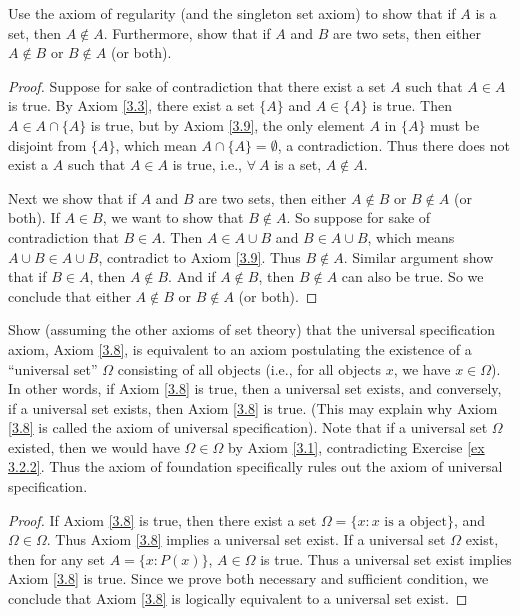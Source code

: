 \begin{exercise}\label{ex 3.2.2}
Use the axiom of regularity (and the singleton set axiom) to show that if \(A\) is a set, then \(A \notin A\).
Furthermore, show that if \(A\) and \(B\) are two sets, then either \(A \notin B\) or \(B \notin A\) (or both).
\end{exercise}

\begin{proof}
Suppose for sake of contradiction that there exist a set \(A\) such that \(A \in A\) is true.
By Axiom \ref{3.3}, there exist a set \(\{A\}\) and \(A \in \{A\}\) is true.
Then \(A \in A \cap \{A\}\) is true, but by Axiom \ref{3.9}, the only element \(A\) in \(\{A\}\) must be disjoint from \(\{A\}\), which mean \(A \cap \{A\} = \emptyset\), a contradiction.
Thus there does not exist a \(A\) such that \(A \in A\) is true, i.e., \(\forall\ A\) is a set, \(A \notin A\).

Next we show that if \(A\) and \(B\) are two sets, then either \(A \notin B\) or \(B \notin A\) (or both).
If \(A \in B\), we want to show that \(B \notin A\).
So suppose for sake of contradiction that \(B \in A\).
Then \(A \in A \cup B\) and \(B \in A \cup B\), which means \(A \cup B \in A \cup B\), contradict to Axiom \ref{3.9}.
Thus \(B \notin A\).
Similar argument show that if \(B \in A\), then \(A \notin B\).
And if \(A \notin B\), then \(B \notin A\) can also be true.
So we conclude that either \(A \notin B\) or \(B \notin A\) (or both).
\end{proof}

\begin{exercise}\label{ex 3.2.3}
Show (assuming the other axioms of set theory) that the universal specification axiom, Axiom \ref{3.8}, is equivalent to an axiom postulating the existence of a ``universal set'' \(\Omega\) consisting of all objects (i.e., for all objects \(x\), we have \(x \in \Omega\)).
In other words, if Axiom \ref{3.8} is true, then a universal set exists, and conversely, if a universal set exists, then Axiom \ref{3.8} is true.
(This may explain why Axiom \ref{3.8} is called the axiom of universal specification).
Note that if a universal set \(\Omega\) existed, then we would have \(\Omega \in \Omega\) by Axiom \ref{3.1}, contradicting Exercise \ref{ex 3.2.2}.
Thus the axiom of foundation specifically rules out the axiom of universal specification.
\end{exercise}

\begin{proof}
If Axiom \ref{3.8} is true, then there exist a set \(\Omega = \{x: x \text{ is a object}\}\), and \(\Omega \in \Omega\).
Thus Axiom \ref{3.8} implies a universal set exist.
If a universal set \(\Omega\) exist, then for any set \(A = \{x: P(x)\}\), \(A \in \Omega\) is true.
Thus a universal set exist implies Axiom \ref{3.8} is true.
Since we prove both necessary and sufficient condition, we conclude that Axiom \ref{3.8} is logically equivalent to a universal set exist.
\end{proof}